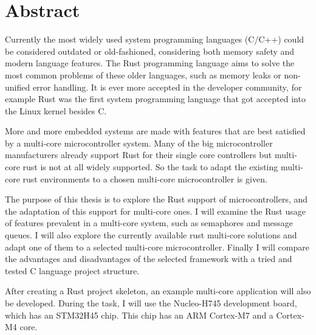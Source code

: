 \chapter*{Abstract}

Currently the most widely used system programming languages (C/C++) could be considered outdated or old-fashioned, considering both memory safety and modern language features. The Rust programming language aims to solve the most common problems of these older languages, such as memory leaks or non-unified error handling. It is ever more accepted in the developer community, for example Rust was the first system programming language that got accepted into the Linux kernel besides C. \cite{FirstRustCommit}

More and more embedded systems are made with features that are best satisfied by a multi-core microcontroller system. Many of the big microcontroller manufacturers already support Rust for their single core controllers but multi-core rust is not at all widely supported. So the task to adapt the existing multi-core rust environments to a chosen multi-core microcontroller is given.

The purpose of this thesis is to explore the Rust support of microcontrollers, and the adaptation of this support for multi-core ones. I will examine the Rust usage of features prevalent in a multi-core system, such as semaphores and message queues. I will also explore the currently available rust multi-core solutions and adapt one of them to a selected multi-core microcontroller. Finally I will compare the advantages and disadvantages of the selected framework with a tried and tested C language project structure.

After creating a Rust project skeleton, an example multi-core application will also be developed. During the task, I will use the Nucleo-H745 development board, which has an STM32H45 chip. This chip has an ARM Cortex-M7 and a Cortex-M4 core.


\vfill
\selectthesislanguage

\setcounter{romanPage}{\value{page}}
